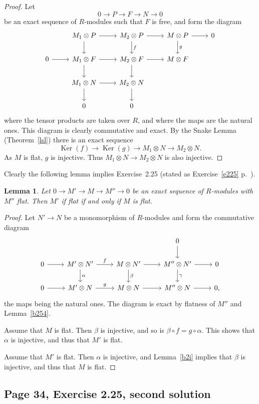 \documentclass[parskip=half,fontsize=12pt]{scrartcl}%
\newcommand{\oo}{\operatorname}\newcommand{\ooo}{\operatorname*}
\newtheorem{lem}[thm]{Lemma}
\begin{document}
\begin{proof}
Let 
$$
0\to P\to F\to N\to 0
$$ 
be an exact sequence of $R$-modules such that $F$ is free, and form the diagram
$$
\begin{tikzcd}
&M_1\otimes P\ar[d]\ar[r]&M_2\otimes P\ar[d,"f"]\ar[r]&M\otimes P\ar[d,"g"]\ar[r]&0\\ 
0\ar[r]&M_1\otimes F\ar[d]\ar[r]&M_2\otimes F\ar[d]\ar[r]&M\otimes F\\ 
&M_1\otimes N\ar[d]\ar[r]&M_2\otimes N\ar[d]\\ 
&0&0
\end{tikzcd}
$$ 
where the tensor products are taken over $R$, and where the maps are the natural ones. This diagram is clearly commutative and exact. By the Snake Lemma (Theorem~\ref{lsl}) there is an exact sequence  
$$
\oo{Ker}(f)\to\oo{Ker}(g)\to M_1\otimes N\to M_2\otimes N.
$$ 
As $M$ is flat, $g$ is injective. Thus $M_1\otimes N\to M_2\otimes N$ is also injective. 
\end{proof}

Clearly the following lemma implies Exercise~2.25 (stated as Exercise~\ref{e225} p.~\pageref{e225}).

\begin{lem}
Let $0\to M'\to M\to M''\to0$ be an exact sequence of $R$-modules with $M''$ flat. Then $M'$ if flat if and only if $M$ is flat.
\end{lem}

\begin{proof}
Let $N'\to N$ be a monomorphism of $R$-modules and form the commutative diagram 
$$
\begin{tikzcd}
&&&0\ar[d]\\ 
0\ar[r]&M'\otimes N'\ar[d,"\alpha"]\ar[r,"f"]&M\otimes N'\ar[d,"\beta"]\ar[r]&M''\otimes N'\ar[d,"\gamma"]\ar[r]&0\\ 
0\ar[r]&M'\otimes N\ar[r,"g"]&M\otimes N\ar[r]&M''\otimes N\ar[r]&0,
\end{tikzcd}
$$ 
the maps being the natural ones. The diagram is exact by flatness of $M''$ and Lemma~\ref{b254}.

Assume that $M$ is flat. Then $\beta$ is injective, and so is $\beta\circ f=g\circ\alpha$. This shows that $\alpha$ is injective, and thus that $M'$ is flat.

Assume that $M'$ is flat. Then $\alpha$ is injective, and Lemma~\ref{b2i} implies that $\beta$ is injective, and thus that $M$ is flat.
\end{proof}

\subsection{Page 34, Exercise 2.25, second solution}\label{sol2}%
\end{document}
